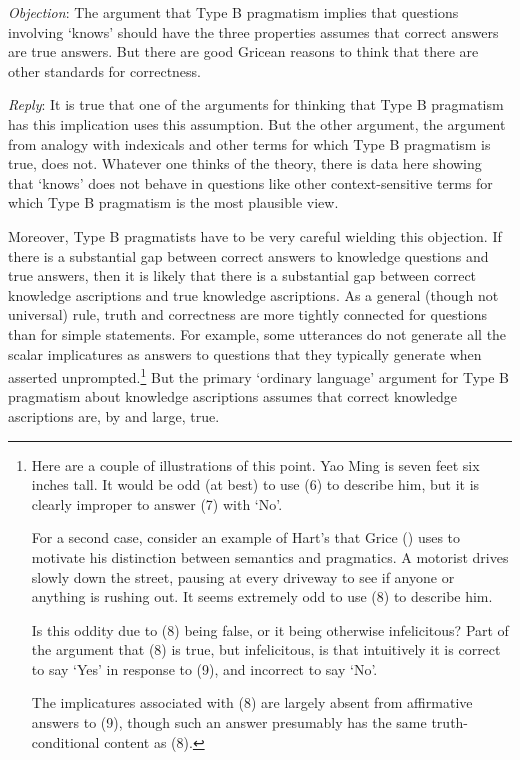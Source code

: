 \documentclass[
  11pt,
  letterpaper,
  DIV=11,
  numbers=noendperiod,
  twoside]{scrartcl}
\begin{document}
\emph{Objection}: The argument that Type B pragmatism implies that
questions involving `knows' should have the three properties assumes
that correct answers are true answers. But there are good Gricean
reasons to think that there are other standards for correctness.

\emph{Reply}: It is true that one of the arguments for thinking that
Type B pragmatism has this implication uses this assumption. But the
other argument, the argument from analogy with indexicals and other
terms for which Type B pragmatism is true, does not. Whatever one thinks
of the theory, there is data here showing that `knows' does not behave
in questions like other context-sensitive terms for which Type B
pragmatism is the most plausible view.

Moreover, Type B pragmatists have to be very careful wielding this
objection. If there is a substantial gap between correct answers to
knowledge questions and true answers, then it is likely that there is a
substantial gap between correct knowledge ascriptions and true knowledge
ascriptions. As a general (though not universal) rule, truth and
correctness are more tightly connected for questions than for simple
statements. For example, some utterances do not generate all the scalar
implicatures as answers to questions that they typically generate when
asserted unprompted.\footnote{Here are a couple of illustrations of this
  point. Yao Ming is seven feet six inches tall. It would be odd (at
  best) to use (6) to describe him, but it is clearly improper to answer
  (7) with `No'.

  For a second case, consider an example of Hart's that Grice
  () uses to motivate his distinction
  between semantics and pragmatics. A motorist drives slowly down the
  street, pausing at every driveway to see if anyone or anything is
  rushing out. It seems extremely odd to use (8) to describe him.

  Is this oddity due to (8) being false, or it being otherwise
  infelicitous? Part of the argument that (8) is true, but infelicitous,
  is that intuitively it is correct to say `Yes' in response to (9), and
  incorrect to say `No'.

  The implicatures associated with (8) are largely absent from
  affirmative answers to (9), though such an answer presumably has the
  same truth-conditional content as (8).} But the primary `ordinary
language' argument for Type B pragmatism about knowledge ascriptions
assumes that correct knowledge ascriptions are, by and large, true.
\end{document}
